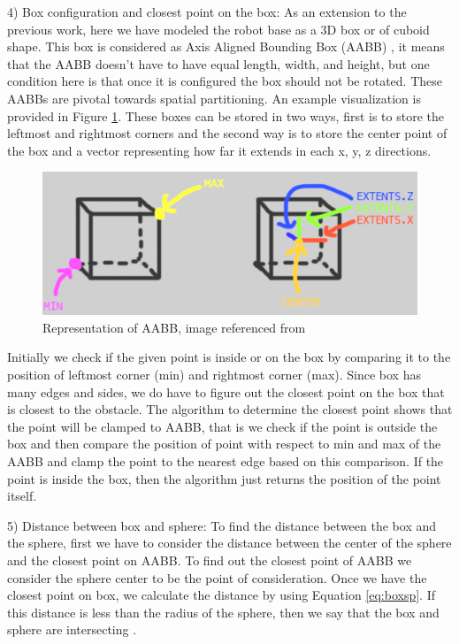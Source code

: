 \documentclass[a4paper, 11.5pt, conference]{ieeeconf}      %
\begin{document}
4) Box configuration and closest point on the box:
As an extension to the previous work, here we have modeled the robot base as a 3D box or of cuboid shape. This box is considered as Axis Aligned Bounding Box (AABB) \cite{3ddet}, it means that the AABB doesn't have to have equal length, width, and height, but one condition here is that once it is configured the box should not be rotated. These AABBs are pivotal towards spatial partitioning. An example visualization is provided in Figure \ref{fig:aabb}. These boxes can be stored in two ways, first is to store the leftmost and rightmost corners and the second way is to store the center point of the box and a vector representing how far it extends in each x, y, z directions.

\begin{figure}[H]
    \centering
    \includegraphics[scale=0.3]{images/aabb.png}
    \caption{Representation of AABB, image referenced from \cite{3ddet}}
    \label{fig:aabb}
\end{figure}

Initially we check if the given point is inside or on the box by comparing it to the position of leftmost corner (min) and rightmost corner (max). Since box has many edges and sides, we do have to figure out the closest point on the box that is closest to the obstacle. The algorithm to determine the closest point shows that the point will be clamped to AABB, that is we check if the point is outside the box and then compare the position of point with respect to min and max of the AABB and clamp the point to the nearest edge based on this comparison. If the point is inside the box, then the algorithm just returns the position of the point itself.

5) Distance between box and sphere:
To find the distance between the box and the sphere, first we have to consider the distance between the center of the sphere and the closest point on AABB. To find out the closest point of AABB we consider the sphere center to be the point of consideration. Once we have the closest point on box, we calculate the distance by using Equation \ref{eq:boxsp}. If this distance is less than the radius of the sphere, then we say that the box and sphere are intersecting \cite{3ddet}.
\end{document}
